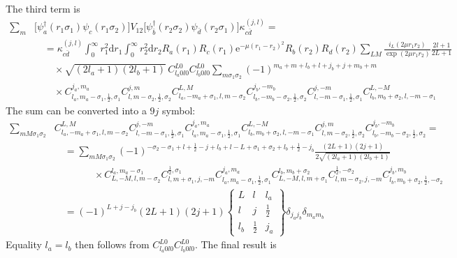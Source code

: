 \documentclass[10pt,a4paper]{article}
\begin{document}
The third term is
\begin{align}
\sum_m &\big[\psi_a^\dagger(r_1\sigma_1)\psi_c(r_1\sigma_2)\big]V_{12}
\big[\psi_{\bar{b}}^\dagger(r_2\sigma_2)\psi_{\bar{d}}(r_2\sigma_1)\big]
\kappa_{c\bar{d}}^{(j,l)} = \nonumber\\
&\quad =\kappa_{c\bar{d}}^{(j,l)} \int_0^\infty r_1^2\mathrm{d}r_1
\int_0^\infty r_2^2\mathrm{d}r_2 R_a(r_1) R_c(r_1) \mathrm{e}^{-\mu(r_1-r_2)^2}
R_b(r_2) R_d(r_2) \sum_{LM}\frac{i_L(2\mu r_1 r_2)}{\exp(2\mu r_1 r_2)}
\frac{2l+1}{2L+1} \nonumber\\
&\qquad\times\sqrt{(2l_a+1)(2l_b+1)}\,
C_{l_a 0 l 0}^{L0} C_{l_b 0 l 0}^{L0} \sum_{m\sigma_1\sigma_2}
(-1)^{m_a+m+l_b+l+j_b+j+m_b+m} \nonumber\\
&\qquad\times C_{l_a,m_a-\sigma_1,\frac{1}{2},\sigma_1}^{j_a,m_a}
C_{l,m-\sigma_2,\frac{1}{2},\sigma_2}^{j,m}
C_{l_a,-m_a+\sigma_1,l,m-\sigma_2}^{L,M}
C_{l_b,-m_b-\sigma_2,\frac{1}{2},\sigma_2}^{j_b,-m_b}
C_{l,-m-\sigma_1,\frac{1}{2},\sigma_1}^{j,-m}
C_{l_b,m_b+\sigma_2,l,-m-\sigma_1}^{L,-M}
\end{align}
The sum can be converted into a $9j$ symbol:
\begin{align}
\sum_{mM\sigma_1\sigma_2}\!\!\! &
C_{l_a,-m_a+\sigma_1,l,m-\sigma_2}^{L,M}
C_{l,-m-\sigma_1,\frac{1}{2},\sigma_1}^{j,-m}
C_{l_a,m_a-\sigma_1,\frac{1}{2},\sigma_1}^{j_a,m_a}
C_{l_b,m_b+\sigma_2,l,-m-\sigma_1}^{L,-M}
C_{l,m-\sigma_2,\frac{1}{2},\sigma_2}^{j,m}
C_{l_b,-m_b-\sigma_2,\frac{1}{2},\sigma_2}^{j_b,-m_b} = \nonumber\\
&\quad=\sum_{mM\sigma_1\sigma_2}
(-1)^{-\sigma_2-\sigma_1+l+\frac{1}{2}-j+l_b+l-L+\sigma_1+\sigma_2+l_b+\frac{1}{2}-j_b}
\frac{(2L+1)(2j+1)}{2\sqrt{(2l_a+1)(2l_b+1)}} \nonumber\\
&\qquad\qquad\times C_{L,-M,l,m-\sigma_2}^{l_a,m_a-\sigma_1}
C_{l,m+\sigma_1,j,-m}^{\frac{1}{2},\sigma_1}
C_{l_a,m_a-\sigma_1,\frac{1}{2},\sigma_1}^{j_a,m_a}
C_{L,-M,l,m+\sigma_1}^{l_b,m_b+\sigma_2}
C_{l,m-\sigma_2,j,-m}^{\frac{1}{2},-\sigma_2}
C_{l_b,m_b+\sigma_2,\frac{1}{2},-\sigma_2}^{j_b,m_b} \nonumber\\
&\quad=(-1)^{L+j-j_b} (2L+1)(2j+1)
\begin{Bmatrix} L & l & l_a \\ l & j & \frac{1}{2} \\
l_b & \frac{1}{2} & j_a \end{Bmatrix}\delta_{j_a j_b}\delta_{m_a m_b}
\tag{V.~10.1.8}
\end{align}
Equality $l_a=l_b$ then follows from $C_{l_a 0 l 0}^{L0} C_{l_b 0 l 0}^{L0}$. The final result is
\end{document}
